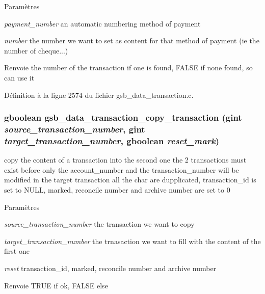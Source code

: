 \begin{DoxyParams}{Paramètres}
\item[{\em payment\_\-number}]an automatic numbering method of payment \item[{\em number}]the number we want to set as content for that method of payment (ie the number of cheque...)\end{DoxyParams}
\begin{DoxyReturn}{Renvoie}
the number of the transaction if one is found, FALSE if none found, so can use it 
\end{DoxyReturn}


Définition à la ligne 2574 du fichier gsb\_\-data\_\-transaction.c.

\subsubsection[{gsb\_\-data\_\-transaction\_\-copy\_\-transaction}]{\setlength{\rightskip}{0pt plus 5cm}gboolean gsb\_\-data\_\-transaction\_\-copy\_\-transaction (gint {\em source\_\-transaction\_\-number}, \/  gint {\em target\_\-transaction\_\-number}, \/  gboolean {\em reset\_\-mark})}\label{gsb__data__transaction_8h_a62c650817612964ece479ede76beb9f3}
copy the content of a transaction into the second one the 2 transactions must exist before only the account\_\-number and the transaction\_\-number will be modified in the target transaction all the char are dupplicated, transaction\_\-id is set to NULL, marked, reconcile number and archive number are set to 0


\begin{DoxyParams}{Paramètres}
\item[{\em source\_\-transaction\_\-number}]the transaction we want to copy \item[{\em target\_\-transaction\_\-number}]the trnasaction we want to fill with the content of the first one \item[{\em reset}]transaction\_\-id, marked, reconcile number and archive number\end{DoxyParams}
\begin{DoxyReturn}{Renvoie}
TRUE if ok, FALSE else 
\end{DoxyReturn}


